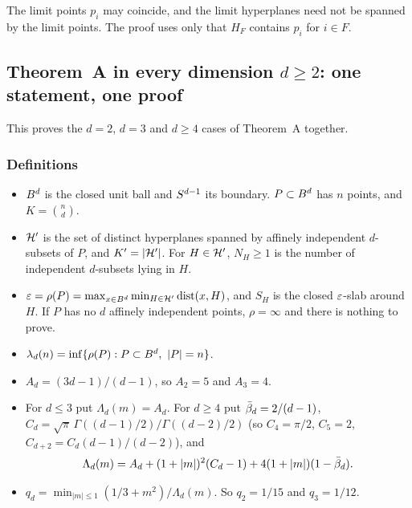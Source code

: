 \begin{remark}
The limit points $p_i$ may coincide, and the limit hyperplanes need not be spanned by the limit
points. The proof uses only that $H_F$ contains $p_i$ for $i \in F$.
\end{remark}

\subsection{\texorpdfstring{Theorem~A in every dimension $d \ge 2$: one statement, one proof}%
{Theorem A in every dimension d >= 2: one statement, one proof}}
\label{sec:A-unified}

This proves the $d = 2$, $d = 3$ and $d \ge 4$ cases of Theorem~A together.

\subsubsection*{Definitions}

\begin{itemize}
  \item $B^d$ is the closed unit ball and $S^{d-1}$ its boundary. $P \subset B^d$ has
    $n$ points, and $K = \binom{n}{d}$.
  \item $\mathcal{H}'$ is the set of distinct hyperplanes spanned by affinely independent $d$-subsets of
    $P$, and $K' = |\mathcal{H}'|$. For $H \in \mathcal{H}'$, $N_H \ge 1$ is the number of independent $d$-subsets
    lying in $H$.
  \item $\varepsilon = \rho(P) = \max_{x \in B^d} \min_{H \in \mathcal{H}'} \operatorname{dist}(x, H)$, and $S_H$ is the
    closed $\varepsilon$-slab around $H$. If $P$ has no $d$ affinely independent points,
    $\rho = \infty$ and there is nothing to prove.
  \item $\lambda_d(n) = \inf\{\rho(P) : P \subset B^d,\ |P| = n\}$.
  \item $A_d = (3d - 1)/(d - 1)$, so $A_2 = 5$ and $A_3 = 4$.
  \item For $d \le 3$ put $\Lambda_d(m) = A_d$. For $d \ge 4$ put $\bar\beta_d = 2/(d-1)$,
    $C_d = \sqrt{\pi}\, \Gamma((d-1)/2) / \Gamma((d-2)/2)$ (so $C_4 = \pi/2$, $C_5 = 2$,
    $C_{d+2} = C_d (d-1)/(d-2)$), and
    \begin{equation*}
      \Lambda_d(m) = A_d + (1+|m|)^2(C_d - 1)
        + 4(1+|m|)(1 - \bar\beta_d).
    \end{equation*}
  \item $q_d = \min_{|m| \le 1} (1/3 + m^2)/\Lambda_d(m)$. So $q_2 = 1/15$ and $q_3 = 1/12$.
\end{itemize}


